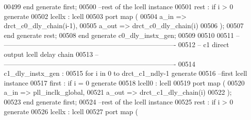 \begin{DoxyCode}
00499    \textcolor{keywordflow}{end} \textcolor{keywordflow}{generate} \textcolor{vhdlchar}{first};
00500 \textcolor{keyword}{   --rest of the lcell instance}
00501    \textcolor{vhdlchar}{rest} \textcolor{vhdlchar}{:} \textcolor{keywordflow}{if} \textcolor{vhdlchar}{i} \textcolor{vhdlchar}{>} \textcolor{vhdllogic}{}\textcolor{vhdllogic}{0} \textcolor{keywordflow}{generate}
00502    lcellx : lcell 
00503       \textcolor{keywordflow}{port} \textcolor{keywordflow}{map} (
00504          a\_in  => drct_c0_dly_chain\textcolor{vhdlchar}{(}i-\textcolor{vhdllogic}{1}\textcolor{vhdlchar}{)},
00505          a\_out => drct_c0_dly_chain\textcolor{vhdlchar}{(}i\textcolor{vhdlchar}{)}
00506          \textcolor{vhdlchar}{)};
00507    \textcolor{keywordflow}{end} \textcolor{keywordflow}{generate} \textcolor{vhdlchar}{rest};
00508 \textcolor{keywordflow}{end} \textcolor{keywordflow}{generate} \textcolor{vhdlchar}{c0\_dly\_instx\_gen};
00509 
00510 
00511 \textcolor{keyword}{-- ----------------------------------------------------------------------------}
00512 \textcolor{keyword}{-- c1 direct output lcell delay chain }
00513 \textcolor{keyword}{-- ----------------------------------------------------------------------------   }
00514 \textcolor{vhdlchar}{c1\_dly\_instx\_gen} \textcolor{vhdlchar}{:} 
00515 \textcolor{keywordflow}{for} \textcolor{vhdlchar}{i} \textcolor{keywordflow}{in} \textcolor{vhdllogic}{}\textcolor{vhdllogic}{0} \textcolor{keywordflow}{to} \textcolor{vhdlchar}{drct_c1_ndly}\textcolor{vhdlchar}{-}\textcolor{vhdllogic}{}\textcolor{vhdllogic}{1} \textcolor{keywordflow}{generate}
00516 \textcolor{keyword}{   --first lcell instance}
00517    \textcolor{vhdlchar}{first} \textcolor{vhdlchar}{:} \textcolor{keywordflow}{if} \textcolor{vhdlchar}{i} \textcolor{vhdlchar}{=} \textcolor{vhdllogic}{}\textcolor{vhdllogic}{0} \textcolor{keywordflow}{generate} 
00518    lcell0 : lcell 
00519       \textcolor{keywordflow}{port} \textcolor{keywordflow}{map} (
00520          a\_in  => pll_inclk_global,
00521          a\_out => drct_c1_dly_chain\textcolor{vhdlchar}{(}i\textcolor{vhdlchar}{)}
00522          \textcolor{vhdlchar}{)};
00523    \textcolor{keywordflow}{end} \textcolor{keywordflow}{generate} \textcolor{vhdlchar}{first};
00524 \textcolor{keyword}{   --rest of the lcell instance}
00525    \textcolor{vhdlchar}{rest} \textcolor{vhdlchar}{:} \textcolor{keywordflow}{if} \textcolor{vhdlchar}{i} \textcolor{vhdlchar}{>} \textcolor{vhdllogic}{}\textcolor{vhdllogic}{0} \textcolor{keywordflow}{generate}
00526    lcellx : lcell 
00527       \textcolor{keywordflow}{port} \textcolor{keywordflow}{map} (

\end{DoxyCode}
